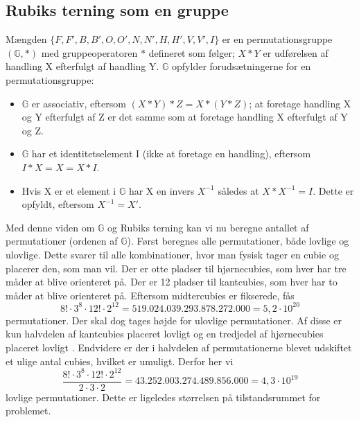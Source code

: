 \documentclass[../main.tex]{subfiles}
\begin{document}
\subsection*{Rubiks terning som en gruppe}
Mængden $\{F, F', B, B', O, O', N, N', H, H', V, V', I\}$ er en permutationsgruppe $(\mathbb{G}, *)$ med gruppeoperatoren $*$ defineret som følger; $X*Y$ er udførelsen af handling X efterfulgt af handling Y. $\mathbb{G}$ opfylder forudsætningerne for en permutationsgruppe: 
\begin{itemize}
	\item $\mathbb{G}$ er associativ, eftersom $(X*Y)*Z=X*(Y*Z)$; at foretage handling X og Y efterfulgt af Z er det samme som at foretage handling X efterfulgt af Y og Z. 
	\item $\mathbb{G}$ har et identitetselement I (ikke at foretage en handling), eftersom $I*X = X = X*I$. 
	\item Hvis X er et element i $\mathbb{G}$ har X en invers $X^{-1}$ således at $X*X^{-1}=I$. Dette er opfyldt, eftersom  $X^{-1}=X'$.  
\end{itemize} 
Med denne viden om $\mathbb{G}$ og Rubiks terning kan vi nu beregne antallet af permutationer (ordenen af $\mathbb{G}$). Først beregnes alle permutationer, både lovlige og ulovlige. Dette svarer til alle kombinationer, hvor man fysisk tager en cubie og placerer den, som man vil. Der er otte pladser til hjørnecubies, som hver har tre måder at blive orienteret på. Der er 12 pladser til kantcubies, som hver har to måder at blive orienteret på. Eftersom midtercubies er fikserede, fås
\begin{equation*}
	8!\cdot3^8\cdot12!\cdot2^{12}=519.024.039.293.878.272.000=5,2\cdot10^{20}
\end{equation*}
permutationer. Der skal dog tages højde for ulovlige permutationer. Af disse er kun halvdelen af kantcubies placeret lovligt og en tredjedel af hjørnecubies placeret lovligt \cite{GroupTheory}. Endvidere er der i halvdelen af permutationerne blevet udskiftet et ulige antal cubies, hvilket er umuligt. Derfor her vi
$$\frac{8!\cdot3^8\cdot12!\cdot2^{12}}{2\cdot3\cdot2}=43.252.003.274.489.856.000=4,3\cdot10^{19}$$
lovlige permutationer. Dette er ligeledes størrelsen på tilstandsrummet for problemet.
\end{document}
